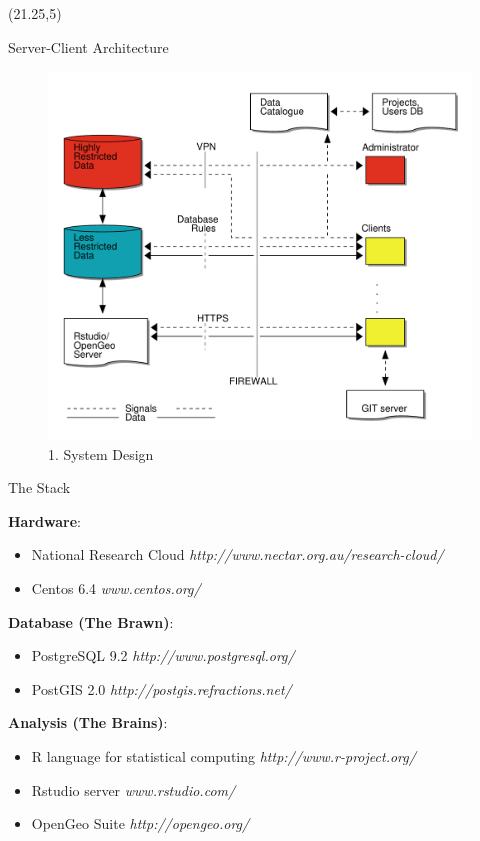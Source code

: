 \documentclass[final]{beamer}
\begin{document}
\begin{frame}{}
\begin{textblock}{17}(21.25,5)
\begin{block}{Server-Client Architecture}
\begin{figure}[!h]
\centering
\includegraphics[width=\textwidth]{opensoft.pdf}
\caption{1. System Design}
\label{fig:sys}
\end{figure}
\end{block}

\begin{block}{The Stack}
\begin{tiny}
\textbf{Hardware}:
\begin{itemize}
\item National Research Cloud \emph{http://www.nectar.org.au/research-cloud/}
\item Centos 6.4 \emph{www.centos.org/}
\end{itemize} 

\textbf{Database (The Brawn)}:
\begin{itemize}
\item PostgreSQL 9.2 \emph{http://www.postgresql.org/}
\item PostGIS 2.0 \emph{http://postgis.refractions.net/}
\end{itemize} 

\textbf{Analysis (The Brains)}:
\begin{itemize}
\item R language for statistical computing \emph{http://www.r-project.org/}
\item Rstudio server \emph{www.rstudio.com/‎}
\item OpenGeo Suite \emph{http://opengeo.org/}
\end{itemize} 


\end{tiny}
\end{block}
\end{textblock}
\end{frame}
\end{document}
